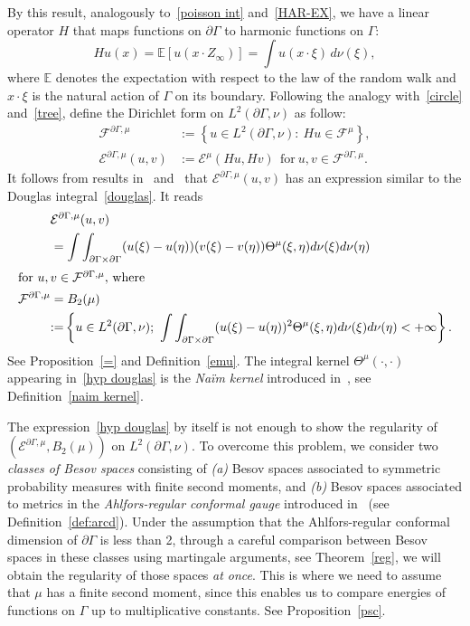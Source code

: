 \documentclass[10pt]{amsart}
\theoremstyle{definition}\newtheorem{defi}[theo]{Definition}\newtheorem{rema}[theo]{Remark}\newtheorem{exam}[theo]{Example}\newtheorem{exem}[theo]{Example}\newtheorem{nota}[theo]{Notation}
\newcommand{\ce}{\mathcal{E}}
\newcommand{\cf}{\mathcal{F}}
\newcommand{\E}{\mathbb{E}}
\begin{document}
By this result, analogously to~\eqref{poisson int} and~\eqref{HAR-EX}, we have a linear operator $H$ that maps functions on $\partial\Gamma$ to harmonic functions on $\Gamma$:
\[
Hu(x)=\E[u(x\cdot Z_\infty)]=\int u(x\cdot\xi)\, d\nu(\xi),
\]
where $\E$ denotes the expectation with respect to the law of the random walk and $x\cdot\xi$ is the natural action of $\Gamma$ on its boundary.
Following the analogy with~\eqref{circle} and~\eqref{tree}, define the Dirichlet form on $L^2(\partial\Gamma,\nu)$ as follow:
\begin{align*}
\cf^{\partial\Gamma,\mu}&:=\left\{u\in L^2(\partial\Gamma,\nu):\ Hu\in \cf^{\mu}\right\},\\
\ce^{\partial\Gamma,\mu}(u,v)&:=\ce^{\mu}(Hu,Hv)\ \ \text{for}\ u,v\in\cf^{\partial\Gamma,\mu}.
\end{align*}
It follows from results in~\cite{Na} and~\cite{Sil} that $\ce^{\partial\Gamma,\mu}(u,v)$ has an expression similar to the Douglas integral~\eqref{douglas}. It reads
\begin{align}
&\ce^{\partial\Gamma,\mu}(u,v)\label{hyp douglas}\\
&=\int\int_{\partial\Gamma\times\partial\Gamma}(u(\xi)-u(\eta))(v(\xi)-v(\eta))\Theta^{\mu}(\xi,\eta)d\nu(\xi)d\nu(\eta)\nonumber\\
\intertext{for $u,v\in\cf^{\partial\Gamma,\mu}$, where}
\cf^{\partial\Gamma,\mu}&=B_2(\mu)\nonumber\\
&{:=} \left\{u\in L^2(\partial\Gamma,\nu);\ \int\int_{\partial\Gamma\times\partial\Gamma}(u(\xi)-u(\eta))^2\Theta^{\mu}(\xi,\eta)d\nu(\xi)d\nu(\eta)<+\infty\right\}.
\nonumber
\end{align}
See Proposition~\ref{=} and Definition~\ref{emu}. The integral kernel $\Theta^{\mu}(\cdot,\cdot)$ appearing in~\eqref{hyp douglas} is the \emph{Na\"{i}m kernel} introduced in~\cite{Na}, see Definition~\ref{naim kernel}.

The expression~\eqref{hyp douglas} by itself is not enough to show the regularity of $(\ce^{\partial\Gamma,\mu}, B_2(\mu))$ on $L^2(\partial\Gamma,\nu)$. To overcome this problem, we consider two \emph{classes of Besov spaces} consisting of \emph{(a)} Besov spaces associated to symmetric probability measures with finite second moments, and \emph{(b)} Besov spaces associated to metrics in the \emph{Ahlfors-regular conformal gauge} introduced in~\cite{BP} (see Definition~\ref{def:arcd}). Under the assumption that the Ahlfors-regular conformal dimension of $\partial\Gamma$ is less than 2, through a careful comparison between Besov spaces in these classes using martingale arguments, see Theorem~\ref{reg}, we will obtain the regularity of those spaces \emph{at once}. This is where we need to assume that $\mu$ has a finite second moment, since this enables us to compare energies of functions on $\Gamma$ up to multiplicative constants. See Proposition~\ref{psc}.
\end{document}
